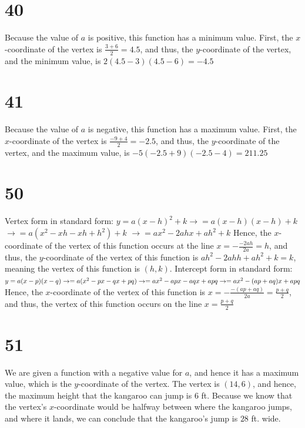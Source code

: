 \documentclass{article}
\theoremstyle{definition}
\begin{document}
\section*{40}
Because the value of $a$ is positive, this function has a minimum value. First, the $x$-coordinate of the vertex is $\frac{3+6}{2}=4.5$, and thus, 
the $y$-coordinate of the vertex, and the minimum value, is $2(4.5-3)(4.5-6)=-4.5$

\section*{41}
Because the value of $a$ is negative, this function has a maximum value. First, the $x$-coordinate of the vertex is $\frac{-9+4}{2}=-2.5$, and thus, 
the $y$-coordinate of the vertex, and the maximum value, is $-5(-2.5+9)(-2.5-4)=211.25$

\section*{50} 
Vertex form in standard form: $y=a(x-h)^2+k$\newline$\rightarrow =a(x-h)(x-h)+k$\newline$\rightarrow =a(x^2-xh-xh+h^2)+k$
\newline$\rightarrow =ax^2-2ahx+ah^2+k$
\newline 
Hence, the $x$-coordinate of the vertex of this function occurs at the line $x=-\frac{-2ah}{2a}=h$, and thus, the $y$-coordinate of the vertex of this 
function is $ah^2-2ahh+ah^2+k=k$, meaning the vertex of this function is $(h,k)$.\newline
Intercept form in standard form: $y=a(x-p)(x-q)\newline\rightarrow =a(x^2-px-qx+pq)\newline\rightarrow =ax^2-apx-aqx+apq\newline\rightarrow 
=ax^2-(ap+aq)x+apq\newline$ Hence, the $x$-coordinate of the vertex of this function is $x=-\frac{-(ap+aq)}{2a}=\frac{p+q}{2}$, and thus, the vertex of 
this function occurs on the line $x=\frac{p+q}{2}$

\section*{51}
We are given a function with a negative value for $a$, and hence it has a maximum value, which is the $y$-coordinate of the vertex. The vertex is 
$(14,6)$, and hence, the maximum height that the kangaroo can jump is $6$ ft. Because we know that the vertex's $x$-coordinate would be halfway 
between where the kangaroo jumps, and where it lands, we can conclude that the kangaroo's jump is $28$ ft. wide.
\end{document}

